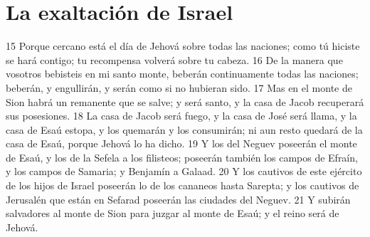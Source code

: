 \section*{La exaltación de Israel}

15 Porque cercano está el día de Jehová sobre todas las naciones; como tú hiciste se hará contigo; tu recompensa volverá sobre tu cabeza.
16 De la manera que vosotros bebisteis en mi santo monte, beberán continuamente todas las naciones; beberán, y engullirán, y serán como si no hubieran sido.
17 Mas en el monte de Sion habrá un remanente que se salve; y será santo, y la casa de Jacob recuperará sus posesiones.
18 La casa de Jacob será fuego, y la casa de José será llama, y la casa de Esaú estopa, y los quemarán y los consumirán; ni aun resto quedará de la casa de Esaú, porque Jehová lo ha dicho.
19 Y los del Neguev poseerán el monte de Esaú, y los de la Sefela a los filisteos; poseerán también los campos de Efraín, y los campos de Samaria; y Benjamín a Galaad.
20 Y los cautivos de este ejército de los hijos de Israel poseerán lo de los cananeos hasta Sarepta; y los cautivos de Jerusalén que están en Sefarad poseerán las ciudades del Neguev.
21 Y subirán salvadores al monte de Sion para juzgar al monte de Esaú; y el reino será de Jehová.

